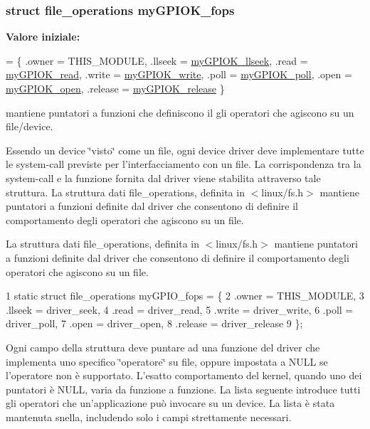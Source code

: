\hypertarget{group___linux-_driver_gad1963bc01fffdbb315a408a9210cbafc}{
\subsubsection[{my\+G\+P\+I\+O\+K\+\_\+fops}]{\setlength{\rightskip}{0pt plus 5cm}struct file\+\_\+operations my\+G\+P\+I\+O\+K\+\_\+fops\hspace{0.3cm}{\ttfamily [static]}}}\label{group___linux-_driver_gad1963bc01fffdbb315a408a9210cbafc}
{\bfseries Valore iniziale\+:}
\begin{DoxyCode}
= \{
        .owner      = THIS\_MODULE,
        .llseek     = \hyperlink{group___linux-_driver_ga66e7f726b72320a272b633ecbaecefff}{myGPIOK\_llseek},
        .read       = \hyperlink{group___linux-_driver_ga90ac339df9c02ae5f11a2a7727adc923}{myGPIOK\_read},
        .write      = \hyperlink{group___linux-_driver_ga1eea0f6c86e8966ba9b701da57502aad}{myGPIOK\_write},
        .poll       = \hyperlink{group___linux-_driver_gaba935e8a8215c2ebce9a7147fd4f5147}{myGPIOK\_poll},
        .open       = \hyperlink{group___linux-_driver_gad013759c18fbf6ea96005b9b3bfa5b4e}{myGPIOK\_open},
        .release    = \hyperlink{group___linux-_driver_ga17ce7f574723246c790b70b06e3e7103}{myGPIOK\_release}
\}
\end{DoxyCode}


mantiene puntatori a funzioni che definiscono il gli operatori che agiscono su un file/device. 

Essendo un device \char`\"{}visto\char`\"{} come un file, ogni device driver deve implementare tutte le system-\/call previste per l'interfacciamento con un file. La corrispondenza tra la system-\/call e la funzione fornita dal driver viene stabilita attraverso tale struttura. La struttura dati file\+\_\+operations, definita in $<$linux/fs.\+h$>$ mantiene puntatori a funzioni definite dal driver che consentono di definire il comportamento degli operatori che agiscono su un file.

La struttura dati file\+\_\+operations, definita in $<$linux/fs.\+h$>$ mantiene puntatori a funzioni definite dal driver che consentono di definire il comportamento degli operatori che agiscono su un file. 
\begin{DoxyCode}
1 static struct file\_operations myGPIO\_fops = \{
2     .owner      = THIS\_MODULE,
3     .llseek     = driver\_seek,
4     .read       = driver\_read,
5     .write      = driver\_write,
6     .poll       = driver\_poll,
7     .open       = driver\_open,
8     .release    = driver\_release
9 \};
\end{DoxyCode}
 Ogni campo della struttura deve puntare ad una funzione del driver che implementa uno specifico \char`\"{}operatore\char`\"{} su file, oppure impostata a N\+U\+L\+L se l'operatore non è supportato. L'esatto comportamento del kernel, quando uno dei puntatori è N\+U\+L\+L, varia da funzione a funzione. La lista seguente introduce tutti gli operatori che un'applicazione può invocare su un device. La lista è stata mantenuta snella, includendo solo i campi strettamente necessari.


